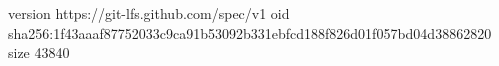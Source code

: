 version https://git-lfs.github.com/spec/v1
oid sha256:1f43aaaf87752033c9ca91b53092b331ebfcd188f826d01f057bd04d38862820
size 43840
